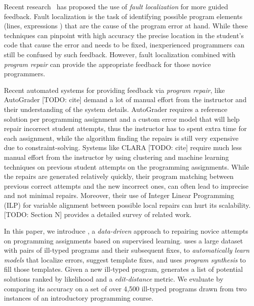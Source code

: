 Recent research~\citep[][]{Seidel:2017, Zhang2014-lv} has proposed the use of
\emph{fault localization} for more guided feedback. Fault localization is the
task of identifying possible program elements (\eg lines, expressions \etc) that
are the cause of the program error at hand. While these techniques can pinpoint
with high accuracy the precise location in the student's code that cause the
error and needs to be fixed, inexperienced programmers can still be confused by
such feedback. However, fault localization combined with \emph{program repair}
can provide the appropriate feedback for those novice programmers.

Recent automated systems for providing feedback via \emph{program repair}, like
AutoGrader [TODO: cite] demand a lot of manual effort from the instructor and
their understanding of the system details. AutoGrader requires a reference
solution per programming assignment and a custom error model that will help
repair incorrect student attempts, thus the instructor has to spent extra time
for each assignment, while the algorithm finding the repairs is still very
expensive due to constraint-solving. Systems like CLARA [TODO: cite] require
much less manual effort from the instructor by using clustering and machine
learning techniques on previous student attempts on the programming assignments.
While the repairs are generated relatively quickly, their program matching
between previous correct attempts and the new incorrect ones, can often lead to
imprecise and not minimal repairs. Moreover, their use of Integer Linear
Programming (ILP) for variable alignment between possible local repairs can hurt
its scalability. [TODO: Section N] provides a detailed survey of related work.

In this paper, we introduce \toolname, a \emph{data-driven} approach to
repairing novice attempts on programming assignments based on supervised
learning. \toolname uses a large dataset with pairs of ill-typed programs and
their subsequent fixes, to \emph{automatically learn models} that localize
errors, suggest template fixes, and uses \emph{program synthesis} to fill those
templates. Given a new ill-typed program, \toolname generates a list of
potential solutions ranked by likelihood and a \emph{edit-distance} metric. We
evaluate \toolname by comparing its accuracy on a set of over 4,500 ill-typed
\ocaml programs drawn from two instances of an introductory programming course.


